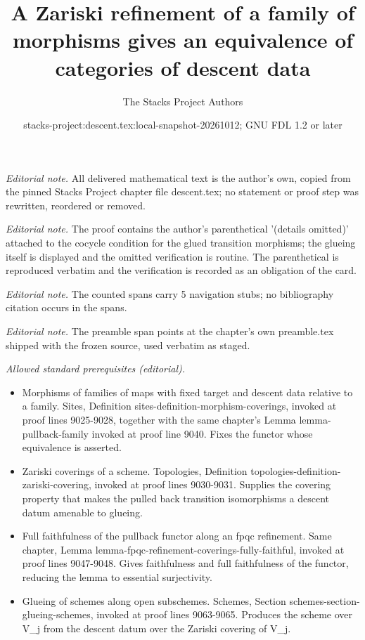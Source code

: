 \documentclass{stacks-project}
\title{A Zariski refinement of a family of morphisms gives an equivalence of categories of descent data}
\author{The Stacks Project Authors}
\date{stacks-project:descent.tex:local-snapshot-20261012; GNU FDL 1.2 or later}
\theoremstyle{plain}
\theoremstyle{definition}
\theoremstyle{remark}
\numberwithin{equation}{subsection}
\begin{document}
\maketitle
\noindent\textit{Editorial note.} All delivered mathematical text is the author's own, copied from the pinned Stacks Project chapter file descent.tex; no statement or proof step was rewritten, reordered or removed.\par\medskip
\noindent\textit{Editorial note.} The proof contains the author's parenthetical '(details omitted)' attached to the cocycle condition for the glued transition morphisms; the glueing itself is displayed and the omitted verification is routine. The parenthetical is reproduced verbatim and the verification is recorded as an obligation of the card.\par\medskip
\noindent\textit{Editorial note.} The counted spans carry 5 navigation stubs; no bibliography citation occurs in the spans.\par\medskip
\noindent\textit{Editorial note.} The preamble span points at the chapter's own preamble.tex shipped with the frozen source, used verbatim as staged.\par\medskip
\noindent\textit{Allowed standard prerequisites (editorial).}\begin{itemize}
\item Morphisms of families of maps with fixed target and descent data relative to a family. Sites, Definition sites-definition-morphism-coverings, invoked at proof lines 9025-9028, together with the same chapter's Lemma lemma-pullback-family invoked at proof line 9040. Fixes the functor whose equivalence is asserted.
\item Zariski coverings of a scheme. Topologies, Definition topologies-definition-zariski-covering, invoked at proof lines 9030-9031. Supplies the covering property that makes the pulled back transition isomorphisms a descent datum amenable to glueing.
\item Full faithfulness of the pullback functor along an fpqc refinement. Same chapter, Lemma lemma-fpqc-refinement-coverings-fully-faithful, invoked at proof lines 9047-9048. Gives faithfulness and full faithfulness of the functor, reducing the lemma to essential surjectivity.
\item Glueing of schemes along open subschemes. Schemes, Section schemes-section-glueing-schemes, invoked at proof lines 9063-9065. Produces the scheme over V\_j from the descent datum over the Zariski covering of V\_j.
\end{itemize}\medskip
\end{document}
